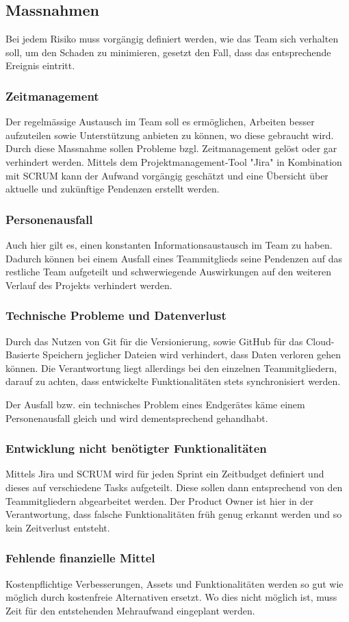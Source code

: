 \documentclass[../main.tex]{subfiles}
\begin{document}
	\subsection{Massnahmen}
	\par Bei jedem Risiko muss vorgängig definiert werden, wie das Team sich verhalten soll, um den Schaden zu minimieren, gesetzt den Fall, dass das entsprechende Ereignis eintritt.
	
	\subsubsection{Zeitmanagement}
	\par Der regelmässige Austausch im Team soll es ermöglichen, Arbeiten besser aufzuteilen sowie Unterstützung anbieten zu können, wo diese gebraucht wird. Durch diese Massnahme sollen Probleme bzgl. Zeitmanagement gelöst oder gar verhindert werden. Mittels dem Projektmanagement-Tool "Jira" in Kombination mit SCRUM  kann der Aufwand vorgängig geschätzt und eine Übersicht über aktuelle und zukünftige Pendenzen erstellt werden.
	
	\subsubsection{Personenausfall}
	\par Auch hier gilt es, einen konstanten Informationsaustausch im Team zu haben. Dadurch können bei einem Ausfall eines Teammitglieds seine Pendenzen auf das restliche Team aufgeteilt und schwerwiegende Auswirkungen auf den weiteren Verlauf des Projekts verhindert werden.
	
	\subsubsection{Technische Probleme und Datenverlust}
	\par Durch das Nutzen von Git für die Versionierung, sowie GitHub für das Cloud-Basierte Speichern jeglicher Dateien wird verhindert, dass Daten verloren gehen können. Die Verantwortung liegt allerdings bei den einzelnen Teammitgliedern, darauf zu achten, dass entwickelte Funktionalitäten stets synchronisiert werden. 
	\par Der Ausfall bzw. ein technisches Problem eines Endgerätes käme einem Personenausfall gleich und wird dementsprechend gehandhabt.
	
	\subsubsection{Entwicklung nicht benötigter Funktionalitäten}
	\par Mittels Jira und SCRUM  wird für jeden Sprint ein Zeitbudget definiert und dieses auf verschiedene Tasks aufgeteilt. Diese sollen dann entsprechend von den Teammitgliedern abgearbeitet werden.  Der Product Owner ist hier in der Verantwortung, dass falsche Funktionalitäten früh genug erkannt werden und so kein Zeitverlust entsteht.
	
	\subsubsection{Fehlende finanzielle Mittel}
	\par Kostenpflichtige Verbesserungen, Assets und Funktionalitäten werden so gut wie möglich durch kostenfreie Alternativen ersetzt. Wo dies nicht möglich ist, muss Zeit für den entstehenden Mehraufwand eingeplant werden.
\end{document}
